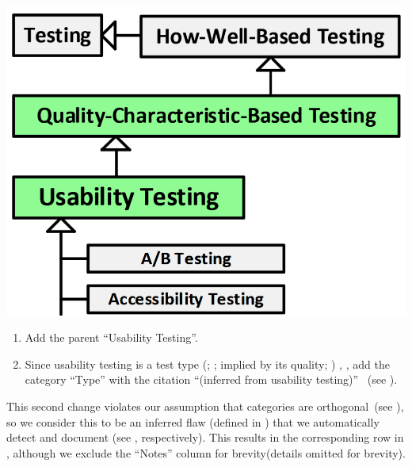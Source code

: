 \begin{minipage}{0.45\linewidth}
    \vspace{0.5cm}
    \includegraphics[width=\linewidth]{assets/images/a-b testing 2.png}
    \label{fig:Firesmith-A-B-Testing}
    \vspace{0.5cm}
\end{minipage}
\begin{minipage}{\ifnotpaper 0.53\else 0.5\fi\linewidth}
    \begin{enumerate}
        \item Add the parent ``Usability Testing''.
        \item Since usability testing is a test type \ifnotpaper
                  (\citealp[pp.~22, 26\=/27]{IEEE2022};
                  \citeyear[pp.~7, 40, Tab.~A.1]{IEEE2021};
                  implied by its quality; \citealp[p.~53]{Firesmith2015})\else
                  \cite[pp.~22, 26\=/27]{IEEE2022},
                  \cite[pp.~7, 40, Tab.~A.1]{IEEE2021}\fi, add the category
              ``Type'' with the citation ``(inferred from usability testing)''%
              \ifnotpaper\ (see )\fi.
    \end{enumerate}
\end{minipage}
This second change violates our assumption that categories are
orthogonal\ifnotpaper\ (see )\fi, so we consider this to be
an inferred flaw \ifnotpaper (defined in ) \fi that we
automatically detect and document \ifnotpaper (see , respectively). This results in the corresponding row
    in , although we exclude the ``Notes''
    column for brevity\else (details omitted for brevity)\fi.

